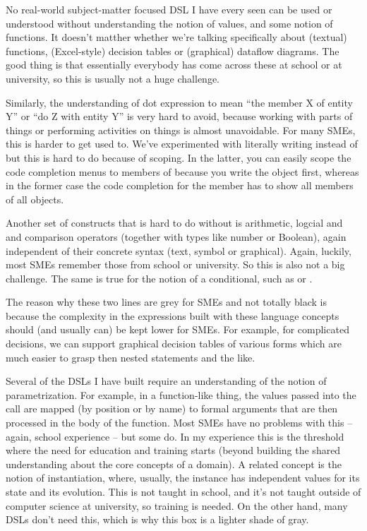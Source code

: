 \documentclass[runningheads]{llncs}
\newcommand{\ic}[1]{\changefont{cmtt}{m}{n}{#1}\normalfont}  %
\newcommand{\changefont}[3]{\fontfamily{#1}\fontseries{#2}\fontshape{#3}\selectfont}
\begin{document}
No real-world subject-matter focused DSL I have every seen can be used or
understood without understanding the notion of values, and some notion of
functions. It doesn't matther whether we're talking specifically about (textual)
functions, (Excel-style) decision tables or (graphical) dataflow diagrams. The
good thing is that essentially everybody has come across these at school or
at university, so this is usually not a huge challenge.

Similarly, the understanding of dot expression to mean ``the member X of entity
Y'' or ``do Z with entity Y'' is very hard to avoid, because working with parts
of things or performing activities on things is almost unavoidable. For many
SMEs, this is harder to get used to. We've experimented with literally writing
\ic{member of object} instead of \ic{object.member} but this is hard to do 
because of scoping. In the latter, you can easily scope the code completion
menus to members of \ic{object} because you write the object first, whereas
in the former case the code completion for the member has to show all members
of all objects.

Another set of constructs that is hard to do without is arithmetic, logcial
and and comparison operators (together with types like number or Boolean), 
again independent of their concrete syntax (text, symbol or graphical). Again,
luckily, most SMEs remember those from school or university. So this is also
not a big challenge. The same is true for the notion of a conditional, such
as \ic{if \ldots then} or \ic{switch\{case, case, case\}}. 

The reason why these two lines are grey for SMEs and not totally black is
because the complexity in the expressions built with these language concepts
should (and usually can) be kept lower for SMEs. For example, for complicated
decisions, we can support graphical decision tables of various forms which are
much easier to grasp then nested \ic{if} statements and the like. 

Several of the DSLs I have built require an understanding of the notion of
parametrization. For example, in a function-like thing, the values passed into
the call are mapped (by position or by name) to formal arguments that are then
processed in the body of the function. Most SMEs have no problems with this
-- again, school experience -- but some do. In my experience this is the 
threshold where the need for education and training starts (beyond building
the shared understanding about the core concepts of a domain). A related
concept is the notion of instantiation, where, usually, the instance has
independent values for its state and its evolution. This is not taught in
school, and it's not taught outside of computer science at university, so
training is needed. On the other hand, many DSLs don't need this, which is
why this box is a lighter shade of gray.
\end{document}
